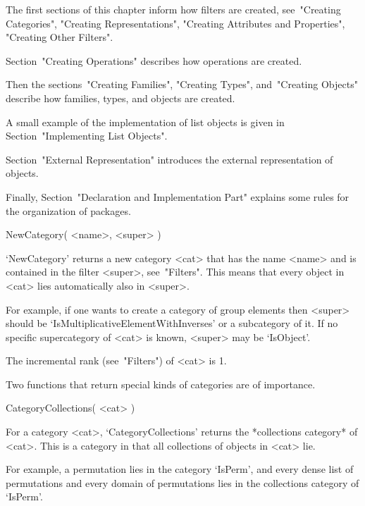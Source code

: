 

The first sections of this chapter inform how filters are created,
see~"Creating Categories", "Creating Representations",
"Creating Attributes and Properties", "Creating Other Filters".

Section~"Creating Operations" describes how operations are created.

Then the sections~"Creating Families", "Creating Types",
and~"Creating Objects" describe how families, types,
and objects are created.

A small example of the implementation of list objects is given
in Section~"Implementing List Objects".

Section~"External Representation" introduces the external representation
of objects.

Finally, Section~"Declaration and Implementation Part" explains some
rules for the organization of {\GAP} packages.



\>NewCategory( <name>, <super> )

`NewCategory' returns a new category <cat> that has the name <name> and
is contained in the filter <super>, see~"Filters".
This means that every object in <cat> lies automatically also in <super>.

For example, if one wants to create a category of group elements
then <super> should be `IsMultiplicativeElementWithInverses' or a
subcategory of it.
If no specific supercategory of <cat> is known,
<super> may be `IsObject'.

The incremental rank (see~"Filters") of <cat> is 1.

Two functions that return special kinds of categories are of importance.

\>CategoryCollections( <cat> )

For a category <cat>,
`CategoryCollections' returns the *collections category* of <cat>.
This is a category in that all collections of objects in <cat> lie.

For example, a permutation lies in the category `IsPerm',
and every dense list of permutations and every domain of permutations
lies in the collections category of `IsPerm'.

